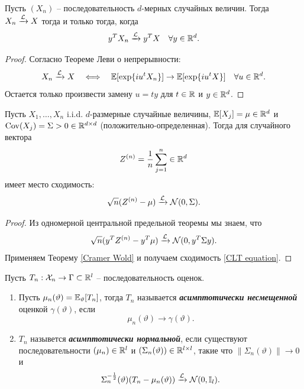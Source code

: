 \begin{thm} \label{Cramer Wold}
	Пусть $(X_n)$ -- последовательность $d$-мерных случайных величин. Тогда $X_n \xrightarrow{\mathcal{L}} X$ тогда и только тогда, когда 
	\[ y^TX_n \xrightarrow{\mathcal{L}} y^TX \quad \forall y \in \mathbb{R}^d. \]
\end{thm}
\begin{proof}
	Согласно Теореме Леви о непрерывности:
	\[ X_n \xrightarrow{\mathcal{L}} X\quad \Longleftrightarrow \quad \mathbb{E}[\exp\{iu^tX_n\}] \rightarrow \mathbb{E}[\exp\{iu^tX\}] \quad \forall u \in \mathbb{R}^d. \]
	Остается только произвести замену $u=ty$ для $t \in \mathbb{R}$ и $y \in \mathbb{R}^d$.
\end{proof}

\begin{thm} \label{CLT}
	Пусть $X_1, \dots, X_n$ i.i.d. $d$-размерные случайные величины, $\mathbb{E}[X_j]=\mu \in \mathbb{R}^d$ и $\mathrm{Cov}(X_j)=\Sigma>0 \in \mathbb{R}^{d \times d}$ (положительно-определенная). Тогда для случайного вектора
	\[ Z^{(n)} = \frac{1}{n}\sum_{j=1}^n \in \mathbb{R}^d \]
	имеет место сходимость:
	\begin{equation} \label{CLT equation}
	\sqrt{n}(Z^{(n)}-\mu) \xrightarrow{\mathcal{L}} \mathcal{N}(0, \Sigma).
	\end{equation}
\end{thm}
\begin{proof}
	Из одномерной центральной предельной теоремы мы знаем, что
	\[ \sqrt{n}(y^TZ^{(n)}-y^T\mu) \xrightarrow{\mathcal{L}} \mathcal{N}(0, y^T\Sigma y). \]
	Применяем Теорему \ref{Cramer Wold} и получаем сходимость \eqref{CLT equation}.
\end{proof}

\begin{defn}
	Пусть $T_n:\mathcal{X}_n \rightarrow \Gamma \subset \mathbb{R}^l$ -- последовательность оценок.
	\begin{enumerate}
		\item Пусть $\mu_n(\vartheta)=\mathbb{E}_\vartheta[T_n]$, тогда $T_n$ называется \textbf{\textit{асимптотически несмещенной}} оценкой $\gamma(\vartheta)$, если
		\[ \mu_n(\vartheta) \rightarrow \gamma(\vartheta). \]
		\item $T_n$ назывется \textbf{\textit{асимптотически нормальной}}, если существуют последовательности $(\mu_n) \in \mathbb{R}^l$ и $(\Sigma_n(\vartheta)) \in \mathbb{R}^{l \times l}$, такие что $\|\Sigma_n(\vartheta) \| \rightarrow 0$ и
		\[ \Sigma_n^{-\frac{1}{2}}(\vartheta)(T_n-\mu_n(\vartheta)) \xrightarrow{\mathcal{L}} \mathcal{N}(0, \mathbb{I}_l). \]
	\end{enumerate}
\end{defn}

